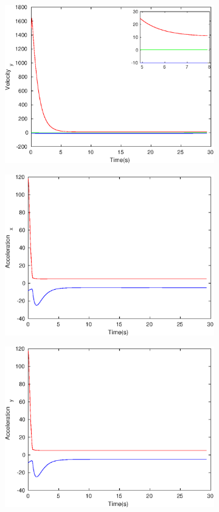 \begin{figure}[h]
\begin{subfigure}{.5\linewidth}
\end{subfigure}
\begin{subfigure}{.5\linewidth}
\centering
\includegraphics[width=.9\linewidth]{figures/Prad/s3cspradVelocity_y}
\end{subfigure}
\begin{subfigure}{.5\linewidth}
\centering
\includegraphics[width=.9\linewidth]{figures/Prad/s3cspradAcceleration_x}
\end{subfigure}
\begin{subfigure}{.5\linewidth}
\centering
\includegraphics[width=.9\linewidth]{figures/Prad/s3cspradAcceleration_y}

\end{subfigure}
\end{figure}

